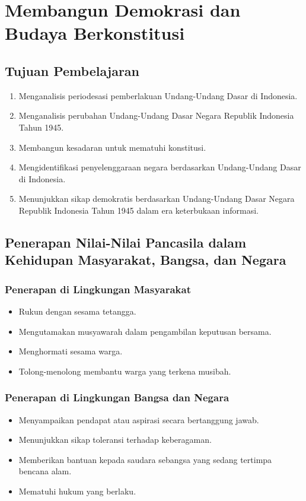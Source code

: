 \section{Membangun Demokrasi dan Budaya Berkonstitusi}

\subsection{Tujuan Pembelajaran}
\begin{enumerate}
\item Menganalisis periodesasi pemberlakuan Undang-Undang Dasar di Indonesia.
\item Menganalisis perubahan Undang-Undang Dasar Negara Republik Indonesia Tahun 1945.
\item Membangun kesadaran untuk mematuhi konstitusi.
\item Mengidentifikasi penyelenggaraan negara berdasarkan Undang-Undang Dasar di Indonesia.
\item Menunjukkan sikap demokratis berdasarkan Undang-Undang Dasar Negara Republik Indonesia Tahun 1945 dalam era keterbukaan informasi.
\end{enumerate}

\subsection{Penerapan Nilai-Nilai Pancasila dalam Kehidupan Masyarakat, Bangsa, dan Negara}
\subsubsection{Penerapan di Lingkungan Masyarakat}
\begin{itemize}
\item Rukun dengan sesama tetangga.
\item Mengutamakan musyawarah dalam pengambilan keputusan bersama.
\item Menghormati sesama warga.
\item Tolong-menolong membantu warga yang terkena musibah.
\end{itemize}

\subsubsection{Penerapan di Lingkungan Bangsa dan Negara}
\begin{itemize}
\item Menyampaikan pendapat atau aspirasi secara bertanggung jawab.
\item Menunjukkan sikap toleransi terhadap keberagaman.
\item Memberikan bantuan kepada saudara sebangsa yang sedang tertimpa bencana alam.
\item Mematuhi hukum yang berlaku.
\end{itemize}

